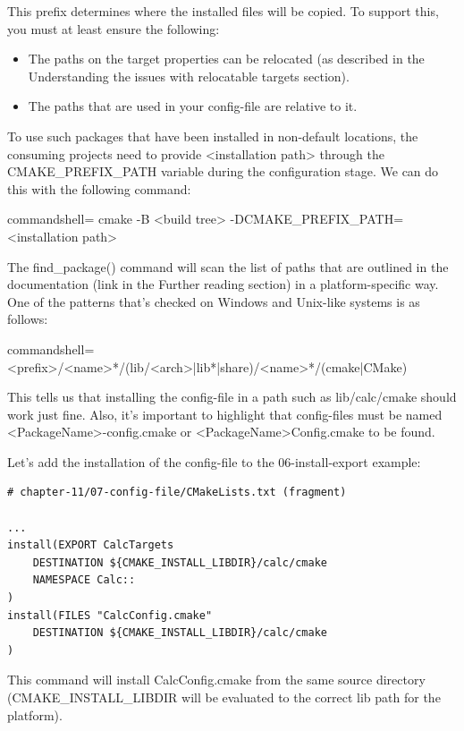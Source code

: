 This prefix determines where the installed files will be copied. To support this, you must at least ensure the following:

\begin{itemize}
\item 
The paths on the target properties can be relocated (as described in the Understanding the issues with relocatable targets section).

\item 
The paths that are used in your config-file are relative to it.
\end{itemize}

To use such packages that have been installed in non-default locations, the consuming projects need to provide <installation path> through the CMAKE\_PREFIX\_PATH variable during the configuration stage. We can do this with the following command:

\begin{tcblisting}{commandshell={}}
cmake -B <build tree> -DCMAKE_PREFIX_PATH=<installation path>
\end{tcblisting}

The find\_package() command will scan the list of paths that are outlined in the documentation (link in the Further reading section) in a platform-specific way. One of the patterns that's checked on Windows and Unix-like systems is as follows:

\begin{tcblisting}{commandshell={}}
<prefix>/<name>*/(lib/<arch>|lib*|share)/<name>*/(cmake|CMake)
\end{tcblisting}

This tells us that installing the config-file in a path such as lib/calc/cmake should work just fine. Also, it's important to highlight that config-files must be named <PackageName>-config.cmake or <PackageName>Config.cmake to be found.

Let's add the installation of the config-file to the 06-install-export example:

\begin{lstlisting}[style=styleCMake]
# chapter-11/07-config-file/CMakeLists.txt (fragment)

...
install(EXPORT CalcTargets
	DESTINATION ${CMAKE_INSTALL_LIBDIR}/calc/cmake
	NAMESPACE Calc::
)
install(FILES "CalcConfig.cmake"
	DESTINATION ${CMAKE_INSTALL_LIBDIR}/calc/cmake
)
\end{lstlisting}

This command will install CalcConfig.cmake from the same source directory (CMAKE\_INSTALL\_LIBDIR will be evaluated to the correct lib path for the platform).

